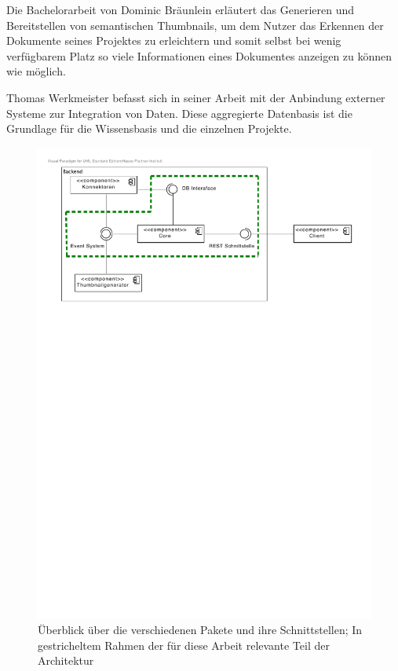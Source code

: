 Die Bachelorarbeit von Dominic Bräunlein \cite{bp-dome} erläutert das Generieren und Bereitstellen von semantischen \gls{Thumbnails}, um dem Nutzer das Erkennen der Dokumente seines Projektes zu erleichtern und somit selbst bei wenig verfügbarem Platz so viele Informationen eines Dokumentes anzeigen zu können wie möglich. 

Thomas Werkmeister befasst sich in seiner Arbeit \cite{bp-tewe} mit der Anbindung externer Systeme zur Integration von Daten. Diese aggregierte Datenbasis ist die Grundlage für die Wissensbasis und die einzelnen Projekte.

\begin{figure}[h]  
  \centering     
  \includegraphics[width=1.0\textwidth]{img/architecture_overview.pdf}  
   \caption{Überblick über die verschiedenen Pakete und ihre Schnittstellen; In gestricheltem Rahmen der für diese Arbeit relevante Teil der Architektur}
  \label{fig:architecture-overview} 
\end{figure}

